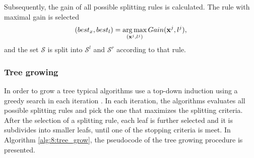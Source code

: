 Subsequently, the gain of all possible splitting rules is calculated. The rule with maximal 
gain is selected
\begin{equation}
  (best_x, best_l) = \operatorname*{arg\,max}_{(\mathbf{x}^j,l^j)}Gain(\mathbf{x}^j,l^j),
\end{equation}
and the set $\mathcal{S}$ is split into $\mathcal{S}^l$ and $\mathcal{S}^r$ according to that rule. 


\subsubsection{Tree growing}
In order to grow a tree typical algorithms use a top-down induction using a greedy search in each
iteration \citep{Rokach2010}. In each iteration, the algorithms evaluates all possible splitting 
rules and pick the one that maximizes the splitting criteria. After the selection of a splitting 
rule, each leaf is further selected and it is subdivides into smaller leafs, until one of the 
stopping criteria is meet. In Algorithm \ref{alg:8:tree_grow}, the pseudocode of the tree 
growing procedure is presented.


  
